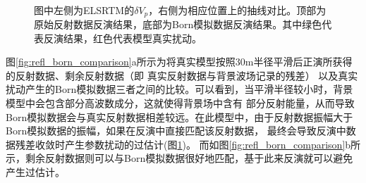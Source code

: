 \begin{figure}[!htb]
   \centering
   \\
   \caption{图中左侧为ELSRTM的$\delta
	   V_p$，右侧为相应位置上的抽线对比。顶部为原始反射数据反演结果，底部为Born模拟数据反演结果。其中绿色代表反演结果，红色代表模型真实扰动。}
   \label{fig:Vpcomparison}
\end{figure}

图\ref{fig:refl_born_comparison}a所示为将真实模型按照30m半径平滑后正演所获得的反射数据、剩余反射数据（即
真实反射数据与背景波场记录的残差）
以及真实扰动产生的Born模拟数据三者之间的比较。可以看到，当平滑半径较小时，背景模型中会包含部分高波数成分，这就使得背景场中含有
部分反射能量，从而导致Born模拟数据会与真实反射数据相差较远。在此模型中，由于反射数据振幅大于Born模拟数据的振幅，如果在反演中直接匹配该反射数据，
最终会导致反演中数据残差收敛时产生参数扰动的过估计(图\ref{fig:Vpcomparison})。
而如图\ref{fig:refl_born_comparison}b所示，剩余反射数据则可以与Born模拟数据很好地匹配，基于此来反演就可以避免产生过估计。

